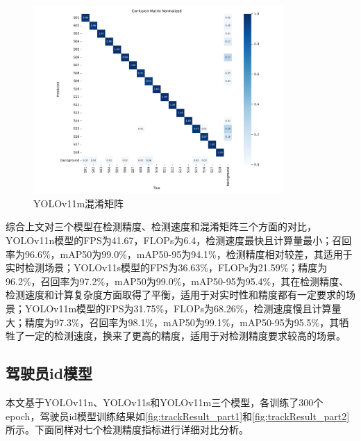 \begin{figure}[h]
    \centering
    \includegraphics[width=0.85\textwidth]{figs/chap04/m_confusion_matrix_normalized.png}
    \caption{YOLOv11m混淆矩阵}
    \label{fig:mmatrix}
\end{figure}

综合上文对三个模型在检测精度、检测速度和混淆矩阵三个方面的对比，YOLOv11n模型的FPS为41.67，FLOPs为6.4，检测速度最快且计算量最小；召回率为96.6\%，mAP50为99.0\%，mAP50-95为94.1\%，检测精度相对较差，其适用于实时检测场景；YOLOv11s模型的FPS为36.63\%，FLOPs为21.59\%；精度为96.2\%，召回率为97.2\%，mAP50为99.0\%，mAP50-95为95.4\%，其在检测精度、检测速度和计算复杂度方面取得了平衡，适用于对实时性和精度都有一定要求的场景；YOLOv11m模型的FPS为31.75\%，FLOPs为68.26\%，检测速度慢且计算量大；精度为97.3\%，召回率为98.1\%，mAP50为99.1\%，mAP50-95为95.5\%，其牺牲了一定的检测速度，换来了更高的精度，适用于对检测精度要求较高的场景。

\subsection{驾驶员id模型}
本文基于YOLOv11n、YOLOv11s和YOLOv11m三个模型，各训练了300个epoch，驾驶员id模型训练结果如\ref{fig:trackResult_part1}和\ref{fig:trackResult_part2}所示。下面同样对七个检测精度指标进行详细对比分析。

